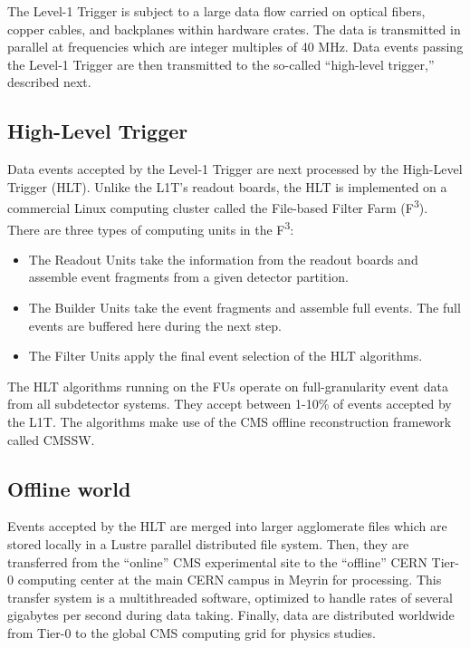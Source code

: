 The Level-1 Trigger is subject to a large data flow carried on optical fibers, 
copper cables, and backplanes within hardware crates. 
The data is transmitted in parallel at frequencies which are integer multiples of 40 MHz.
Data events passing the Level-1 Trigger are then transmitted to the so-called ``high-level trigger,'' described next.

\subsection{High-Level Trigger}
Data events accepted by the Level-1 Trigger are next processed by the High-Level Trigger (HLT).
Unlike the L1T's readout boards, the HLT is implemented on a commercial Linux computing cluster
called the File-based Filter Farm (F\textsuperscript{3}). There are three types of computing units in the F\textsuperscript{3}:
\begin{itemize}
\item The Readout Units take the information from the readout boards and assemble event fragments from a given detector partition.
\item The Builder Units take the event fragments and assemble full events. The full events are buffered here during the next step.
\item The Filter Units apply the final event selection of the HLT algorithms.
\end{itemize}
The HLT algorithms running on the FUs operate on full-granularity event data
from all subdetector systems. They accept between 1-10\% of events accepted by the L1T.
The algorithms make use of the CMS offline reconstruction framework called CMSSW.

\subsection{Offline world}
Events accepted by the HLT are merged into larger agglomerate files which are stored
locally in a Lustre parallel distributed file system.
Then, they are transferred from the ``online'' CMS experimental site to the
``offline'' CERN Tier-0 computing center at the main CERN campus in Meyrin for processing.
This transfer system is a multithreaded software,
optimized to handle rates of several gigabytes per second during data taking.
Finally, data are distributed worldwide from Tier-0 to the global CMS computing grid for physics studies.
